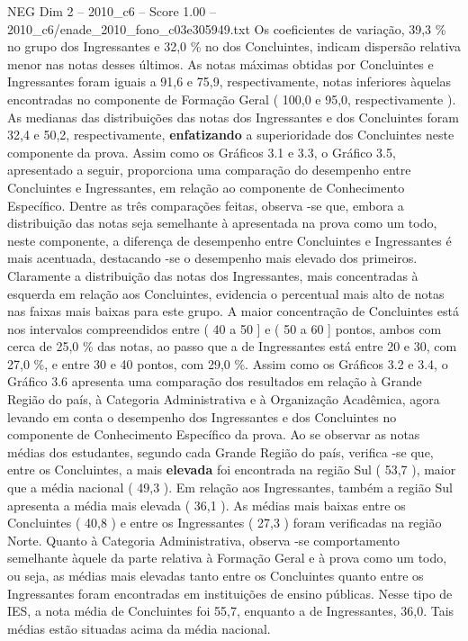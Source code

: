 \begin{textsample}{NEG Dim 2 – 2010\_c6 – Score 1.00 – 2010\_c6/enade\_2010\_fono\_c03e305949.txt}
Os coeficientes de variação, 39,3 \% no grupo dos Ingressantes e 32,0 \% no dos Concluintes, indicam dispersão relativa menor nas notas desses últimos.
As notas máximas obtidas por Concluintes e Ingressantes foram iguais a 91,6 e 75,9, respectivamente, notas inferiores àquelas encontradas no componente de Formação Geral ( 100,0 e 95,0, respectivamente ).
As medianas das distribuições das notas dos Ingressantes e dos Concluintes foram 32,4 e 50,2, respectivamente, \textbf{enfatizando} a superioridade dos Concluintes neste componente da prova.
Assim como os Gráficos 3.1 e 3.3, o Gráfico 3.5, apresentado a seguir, proporciona uma comparação do desempenho entre Concluintes e Ingressantes, em relação ao componente de Conhecimento Específico.
Dentre as três comparações feitas, observa -se que, embora a distribuição das notas seja semelhante à apresentada na prova como um todo, neste componente, a diferença de desempenho entre Concluintes e Ingressantes é mais acentuada, destacando -se o desempenho mais elevado dos primeiros.
Claramente a distribuição das notas dos Ingressantes, mais concentradas à esquerda em relação aos Concluintes, evidencia o percentual mais alto de notas nas faixas mais baixas para este grupo.
A maior concentração de Concluintes está nos intervalos compreendidos entre ( 40 a 50 ] e ( 50 a 60 ] pontos, ambos com cerca de 25,0 \% das notas, ao passo que a de Ingressantes está entre 20 e 30, com 27,0 \%, e entre 30 e 40 pontos, com 29,0 \%.
Assim como os Gráficos 3.2 e 3.4, o Gráfico 3.6 apresenta uma comparação dos resultados em relação à Grande Região do país, à Categoria Administrativa e à Organização Acadêmica, agora levando em conta o desempenho dos Ingressantes e dos Concluintes no componente de Conhecimento Específico da prova.
Ao se observar as notas médias dos estudantes, segundo cada Grande Região do país, verifica -se que, entre os Concluintes, a mais \textbf{elevada} foi encontrada na região Sul ( 53,7 ), maior que a média nacional ( 49,3 ).
Em relação aos Ingressantes, também a região Sul apresenta a média mais elevada ( 36,1 ).
As médias mais baixas entre os Concluintes ( 40,8 ) e entre os Ingressantes ( 27,3 ) foram verificadas na região Norte.
Quanto à Categoria Administrativa, observa -se comportamento semelhante àquele da parte relativa à Formação Geral e à prova como um todo, ou seja, as médias mais elevadas tanto entre os Concluintes quanto entre os Ingressantes foram encontradas em instituições de ensino públicas.
Nesse tipo de IES, a nota média de Concluintes foi 55,7, enquanto a de Ingressantes, 36,0.
Tais médias estão situadas acima da média nacional.

\end{textsample}
